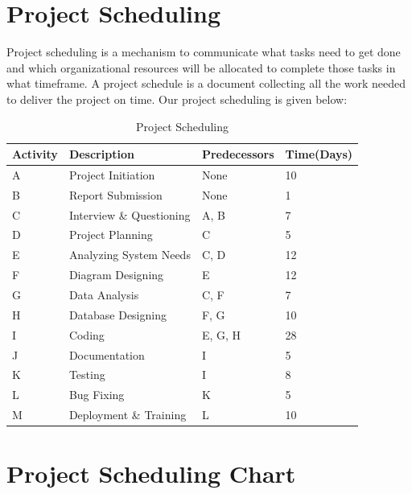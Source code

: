 \section{Project Scheduling}
 Project scheduling is a mechanism to communicate what tasks need to get done and which organizational resources will be allocated to complete those tasks in what timeframe. A project schedule is a document collecting all the work needed to deliver the project on time. Our project scheduling is given below: \\
 
 
 \begin{table}[h]
  \begin{center}


\begin{tabular}{ |p{2cm}|p{5cm}|p{3cm}|p{3cm}| }
 \hline
 \textbf{Activity}&\textbf{Description}&\textbf{Predecessors}&\textbf{Time(Days)}\\
 \hline
    A& Project Initiation&None&10\\
 \hline
    B&Report Submission&None&1\\
 \hline
    C&Interview \& Questioning&A, B&7\\
 \hline
    D&Project Planning&C&5\\
 \hline
    E&Analyzing System Needs &C, D&12\\
 \hline
    F&Diagram Designing&E&12\\
    \hline
    G&Data Analysis&C, F&7\\
 \hline
    H&Database Designing&F, G&10\\
\hline
 I&Coding&E, G, H&28\\
 \hline
 J&Documentation&I&5\\
 \hline
K&Testing&I&8\\
\hline
 L&Bug Fixing&K&5\\
\hline
 M&Deployment \& Training&L&10\\
 \hline
\end{tabular}
\end{center}
\caption{Project Scheduling}
\end{table}


\section{Project Scheduling Chart}


